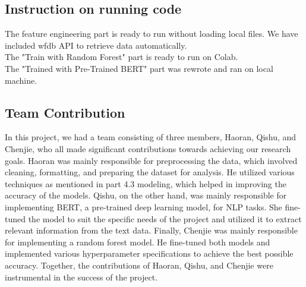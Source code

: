 \subsection{Instruction on running code}
The feature engineering part is ready to run without loading local files. We have included wfdb API to retrieve data automatically. \\
The "Train with Random Forest" part is ready to run on Colab. \\
The "Trained with Pre-Trained BERT" part was rewrote and ran on local machine. \\

\subsection{Team Contribution}
In this project, we had a team consisting of three members, Haoran, Qishu, and Chenjie, who all made significant contributions towards achieving our research goals. Haoran was mainly responsible for preprocessing the data, which involved cleaning, formatting, and preparing the dataset for analysis. He utilized various techniques as mentioned in part 4.3 modeling, which helped in improving the accuracy of the models. Qishu, on the other hand, was mainly responsible for implementing BERT, a pre-trained deep learning model, for NLP tasks. She fine-tuned the model to suit the specific needs of the project and utilized it to extract relevant information from the text data. Finally, Chenjie was mainly responsible for implementing a random forest model. He fine-tuned both models and implemented various hyperparameter specifications to achieve the best possible accuracy. Together, the contributions of Haoran, Qishu, and Chenjie were instrumental in the success of the project.